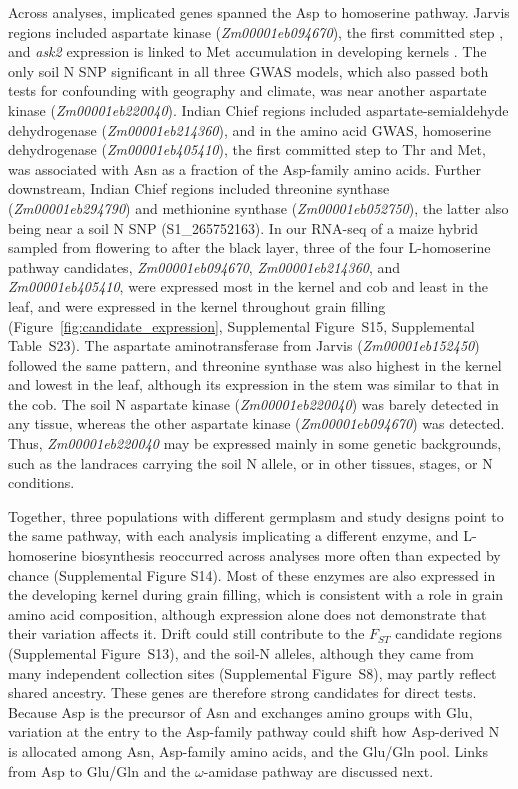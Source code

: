 \documentclass[namedate,unnumsec,webpdf,contemporary,large]{oup-authoring-template}
\begin{document}
Across analyses, implicated genes spanned the Asp to homoserine pathway. Jarvis regions included aspartate kinase (\textit{Zm00001eb094670}), the first committed step \citep{Viola2001AspartatePathway}, and \textit{ask2} expression is linked to Met accumulation in developing kernels \citep{Duo2026Ask2}. The only soil N SNP significant in all three GWAS models, which also passed both tests for confounding with geography and climate, was near another aspartate kinase (\textit{Zm00001eb220040}). Indian Chief regions included aspartate-semialdehyde dehydrogenase (\textit{Zm00001eb214360}), and in the amino acid GWAS, homoserine dehydrogenase (\textit{Zm00001eb405410}), the first committed step to Thr and Met, was associated with Asn as a fraction of the Asp-family amino acids. Further downstream, Indian Chief regions included threonine synthase (\textit{Zm00001eb294790}) and methionine synthase (\textit{Zm00001eb052750}), the latter also being near a soil N SNP (S1\_265752163). In our RNA-seq of a maize hybrid sampled from flowering to after the black layer, three of the four L-homoserine pathway candidates, \textit{Zm00001eb094670}, \textit{Zm00001eb214360}, and \textit{Zm00001eb405410}, were expressed most in the kernel and cob and least in the leaf, and were expressed in the kernel throughout grain filling (Figure~\ref{fig:candidate_expression}, Supplemental Figure~S15, Supplemental Table~S23). The aspartate aminotransferase from Jarvis (\textit{Zm00001eb152450}) followed the same pattern, and threonine synthase was also highest in the kernel and lowest in the leaf, although its expression in the stem was similar to that in the cob. The soil N aspartate kinase (\textit{Zm00001eb220040}) was barely detected in any tissue, whereas the other aspartate kinase (\textit{Zm00001eb094670}) was detected. Thus, \textit{Zm00001eb220040} may be expressed mainly in some genetic backgrounds, such as the landraces carrying the soil N allele, or in other tissues, stages, or N conditions.

Together, three populations with different germplasm and study designs point to the same pathway, with each analysis implicating a different enzyme, and L-homoserine biosynthesis reoccurred across analyses more often than expected by chance (Supplemental Figure S14). Most of these enzymes are also expressed in the developing kernel during grain filling, which is consistent with a role in grain amino acid composition, although expression alone does not demonstrate that their variation affects it. Drift could still contribute to the $F_{ST}$ candidate regions (Supplemental Figure~S13), and the soil-N alleles, although they came from many independent collection sites (Supplemental Figure~S8), may partly reflect shared ancestry. These genes are therefore strong candidates for direct tests. Because Asp is the precursor of Asn and exchanges amino groups with Glu, variation at the entry to the Asp-family pathway could shift how Asp-derived N is allocated among Asn, Asp-family amino acids, and the Glu/Gln pool. Links from Asp to Glu/Gln and the $\omega$-amidase pathway are discussed next.
\end{document}
